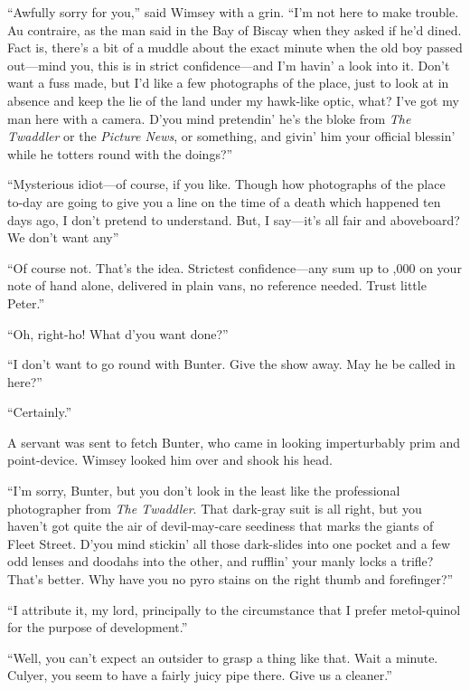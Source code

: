\enquote{Awfully sorry for you,} said Wimsey with a grin. \enquote{I'm not here to make trouble. Au contraire, as the man said in the Bay of Biscay when they asked if he'd dined. Fact is, there's a bit of a muddle about the exact minute when the old boy passed out\allowbreak---\allowbreak mind you, this is in strict confidence\allowbreak---\allowbreak and I'm havin' a look into it. Don't want a fuss made, but I'd like a few photographs of the place, just to look at in absence and keep the lie of the land under my hawk-like optic, what? I've got my man here with a camera. D'you mind pretendin' he's the bloke from \textit{The Twaddler} or the \textit{Picture News}, or something, and givin' him your official blessin' while he totters round with the doings?}

\enquote{Mysterious idiot\allowbreak---\allowbreak of course, if you like. Though how photographs of the place to-day are going to give you a line on the time of a death which happened ten days ago, I don't pretend to understand. But, I say\allowbreak---\allowbreak it's all fair and aboveboard? We don't want any\longdash}

\enquote{Of course not. That's the idea. Strictest confidence\allowbreak---\allowbreak any sum up to ,000 on your note of hand alone, delivered in plain vans, no reference needed. Trust little Peter.}

\enquote{Oh, right-ho! What d'you want done?}

\enquote{I don't want to go round with Bunter. Give the show away. May he be called in here?}

\enquote{Certainly.}

A servant was sent to fetch Bunter, who came in looking imperturbably prim and point-device. Wimsey looked him over and shook his head.

\enquote{I'm sorry, Bunter, but you don't look in the least like the professional photographer from \textit{The Twaddler}. That dark-gray suit is all right, but you haven't got quite the air of devil-may-care seediness that marks the giants of Fleet Street. D'you mind stickin' all those dark-slides into one pocket and a few odd lenses and doodahs into the other, and rufflin' your manly locks a trifle? That's better. Why have you no pyro stains on the right thumb and forefinger?}

\enquote{I attribute it, my lord, principally to the circumstance that I prefer metol-quinol for the purpose of development.}

\enquote{Well, you can't expect an outsider to grasp a thing like that. Wait a minute. Culyer, you seem to have a fairly juicy pipe there. Give us a cleaner.}

